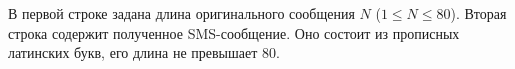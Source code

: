 В первой строке задана длина оригинального сообщения $N$ ($1 \le N \le 80$).
Вторая строка содержит полученное SMS-сообщение.
Оно состоит из прописных латинских букв, его длина не превышает 80.
